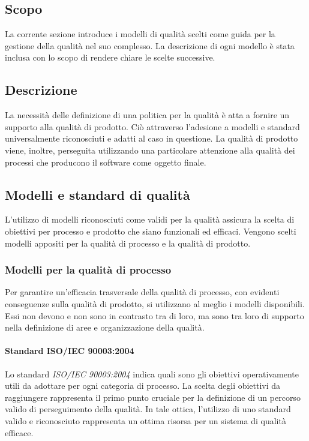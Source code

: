 \documentclass[12pt,a4paper]{article}
\begin{document}
\subsection{Scopo}
La corrente sezione introduce i modelli di qualità scelti come guida per la gestione della qualità nel suo complesso. La descrizione di ogni modello è stata inclusa con lo scopo di rendere chiare le scelte successive.

\subsection{Descrizione}
La necessità delle definizione di una politica per la qualità è atta a fornire un supporto alla qualità di prodotto. Ciò attraverso l'adesione a modelli e standard universalmente riconosciuti e adatti al caso in questione. La qualità di prodotto viene, inoltre, perseguita utilizzando una particolare attenzione alla qualità dei processi che producono il software come oggetto finale.

\subsection{Modelli e standard di qualità}
L'utilizzo di modelli riconosciuti come validi per la qualità assicura la scelta di obiettivi per processo e prodotto che siano funzionali ed efficaci. Vengono scelti modelli appositi per la qualità di processo e la qualità di prodotto.

\subsubsection{Modelli per la qualità di processo}
Per garantire un'efficacia trasversale della qualità di processo, con evidenti conseguenze sulla qualità di prodotto, si utilizzano al meglio i modelli disponibili. Essi non devono e non sono  in contrasto tra di loro, ma sono tra loro di supporto nella definizione di aree e organizzazione della qualità.

\paragraph{Standard ISO/IEC 90003:2004}
Lo standard \textit{ISO/IEC 90003:2004} indica quali sono gli obiettivi operativamente utili da adottare per ogni categoria di processo. La scelta degli obiettivi da raggiungere rappresenta il primo punto cruciale per la definizione di un percorso valido di perseguimento della qualità. In tale ottica, l'utilizzo di uno standard valido e riconosciuto rappresenta un ottima risorsa per un sistema di qualità efficace.
\end{document}
